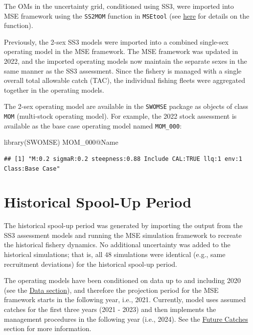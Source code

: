 \documentclass[
]{article}
\newenvironment{Shaded}{\begin{snugshade}}{\end{snugshade}}
\newcommand{\FunctionTok}[1]{\textcolor[rgb]{0.00,0.00,0.00}{#1}}
\newcommand{\NormalTok}[1]{#1}
\newcommand{\SpecialCharTok}[1]{\textcolor[rgb]{0.00,0.00,0.00}{#1}}
\begin{document}
The OMs in the uncertainty grid, conditioned using SS3, were imported into MSE framework using the \texttt{SS2MOM} function in \texttt{MSEtool} (see \href{https://msetool.openmse.com/reference/SS2MOM.html}{here} for details on the function).

Previously, the 2-sex SS3 models were imported into a combined single-sex operating model in the MSE framework. The MSE framework was updated in 2022, and the imported operating models now maintain the separate sexes in the same manner as the SS3 assessment. Since the fishery is managed with a single overall total allowable catch (TAC), the individual fishing fleets were aggregated together in the operating models.

The 2-sex operating model are available in the \texttt{SWOMSE} package as objects of class \texttt{MOM} (multi-stock operating model). For example, the 2022 stock assessment is available as the base case operating model named \texttt{MOM\_000}:

\begin{Shaded}
\begin{Highlighting}[]
\FunctionTok{library}\NormalTok{(SWOMSE)}
\NormalTok{MOM\_000}\SpecialCharTok{@}\NormalTok{Name}
\end{Highlighting}
\end{Shaded}

\begin{verbatim}
## [1] "M:0.2 sigmaR:0.2 steepness:0.88 Include CAL:TRUE llq:1 env:1 Class:Base Case"
\end{verbatim}

\hypertarget{historical-spool-up-period}{%
\section{Historical Spool-Up Period}\label{historical-spool-up-period}}

The historical spool-up period was generated by importing the output from the SS3 assessment models and running the MSE simulation framework to recreate the historical fishery dynamics. No additional uncertainty was added to the historical simulations; that is, all \(48\) simulations were identical (e.g., same recruitment deviations) for the historical spool-up period.

The operating models have been conditioned on data up to and including 2020 (see the \protect\hyperlink{data}{Data section}), and therefore the projection period for the MSE framework starts in the following year, i.e., 2021. Currently, model uses assumed catches for the first three years (2021 - 2023) and then implements the management procedures in the following year (i.e., 2024). See the \protect\hyperlink{future-catches}{Future Catches} section for more information.
\end{document}

